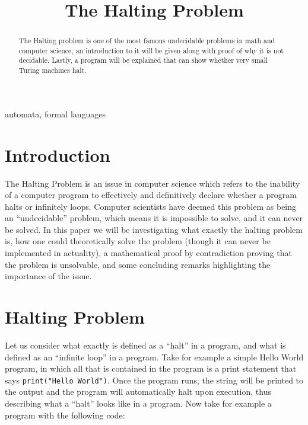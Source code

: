 \documentclass[journal,12pt,onecolumn,draftclsnofoot,]{IEEEtran}
\begin{document}
\title{The Halting Problem}

\author{

}

\maketitle

\begin{abstract}
  The Halting problem is one of the most famous undecidable problems in math and computer 
  science, an introduction to it will be given along with proof of why it is not decidable.
  Lastly, a program will be explained that can show whether very small Turing machines halt.
\end{abstract}

\begin{IEEEkeywords}
automata, formal languages
\end{IEEEkeywords}

\section{Introduction}

The Halting Problem is an issue in computer science which refers to the inability of a computer program to effectively and definitively declare whether a program halts or infinitely loops. Computer scientists have deemed this problem as being an “undecidable” problem, which means it is impossible to solve, and it can never be solved.\cite{computable_numbers} In this paper we will be investigating what exactly the halting problem is, how one could theoretically solve the problem (though it can never be implemented in actuality), a mathematical proof by contradiction proving that the problem is unsolvable, and some concluding remarks highlighting the importance of the issue. 

\section{Halting Problem}

Let us consider what exactly is defined as a “halt” in a program, and what is defined as an “infinite loop” in a program. \cite{intro} Take for example a simple Hello World program, in which all that is contained in the program is a print statement that says \verb|print("Hello World")|. Once the program runs, the string will be printed to the output and the program will automatically halt upon execution, thus describing what a “halt” looks like in a program. Now take for example a program with the following code: 
\end{document}
